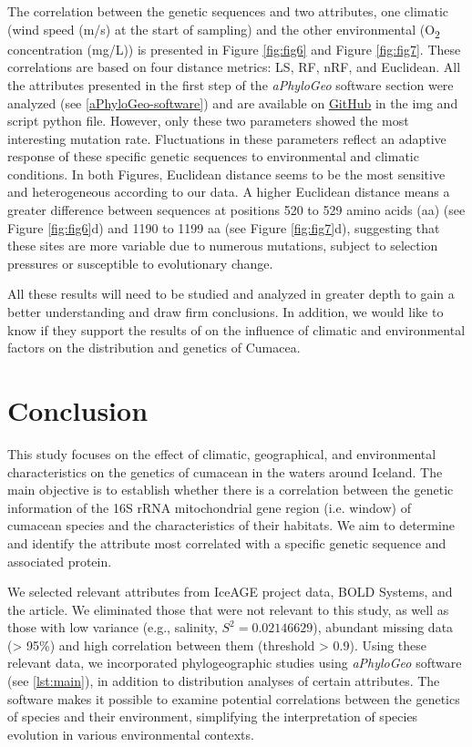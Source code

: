 The correlation between the genetic sequences and two attributes, one climatic (wind speed (m/s) at the start of sampling) and the other environmental (O\textsubscript{2} concentration (mg/L)) is presented in Figure \ref{fig:fig6} and Figure \ref{fig:fig7}. These correlations are based on four distance metrics: LS, RF, nRF, and Euclidean. All the attributes presented in the first step of the \textit{aPhyloGeo} software section were analyzed (see \autoref{aPhyloGeo-software}) and are available on \href{https://github.com/tahiri-lab/Cumacea_aPhyloGeo}{GitHub} in the img and script python file. However, only these two parameters showed the most interesting mutation rate. Fluctuations in these parameters reflect an adaptive response of these specific genetic sequences to environmental and climatic conditions. In both Figures, Euclidean distance seems to be the most sensitive and heterogeneous according to our data. A higher Euclidean distance means a greater difference between sequences at positions 520 to 529 amino acids (aa) (see Figure \ref{fig:fig6}d) and 1190 to 1199 aa (see Figure \ref{fig:fig7}d), suggesting that these sites are more variable due to numerous mutations, subject to selection pressures or susceptible to evolutionary change. 

All these results will need to be studied and analyzed in greater depth to gain a better understanding and draw firm conclusions. In addition, we would like to know if they support the results of \citep{uhlir_adding_2021} on the influence of climatic and environmental factors on the distribution and genetics of Cumacea.

\section{Conclusion}\label{conclusion}

This study focuses on the effect of climatic, geographical, and environmental characteristics on the genetics of cumacean in the waters around Iceland. The main objective is to establish whether there is a correlation between the genetic information of the 16S rRNA mitochondrial gene region (i.e. window) of cumacean species and the characteristics of their habitats. We aim to determine and identify the attribute most correlated with a specific genetic sequence and associated protein.

We selected relevant attributes from IceAGE project data, BOLD Systems, and the \citep{uhlir_adding_2021} article. We eliminated those that were not relevant to this study, as well as those with low variance (e.g., salinity, $S^2 = 0.02146629$), abundant missing data (> 95\%) and high correlation between them (threshold > 0.9). Using these relevant data, we incorporated phylogeographic studies using \textit{aPhyloGeo} software (see \autoref{lst:main}), in addition to distribution analyses of certain attributes. The software makes it possible to examine potential correlations between the genetics of species and their environment, simplifying the interpretation of species evolution in various environmental contexts.

